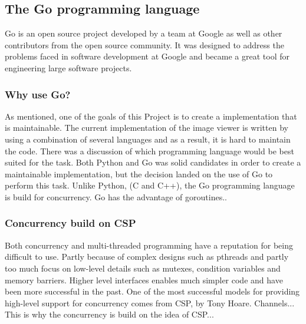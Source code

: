 \documentclass[12pt, a4paper, oneside]{article}
\begin{document}
\subsection{The Go programming language}
Go is an open source project developed by a team at Google as well as other contributors from the open source community. It was designed to address the problems faced in software development at Google and became a great tool for engineering large software projects.

\subsubsection{Why use Go?}
As mentioned, one of the goals of this Project is to create a implementation that is maintainable. The current implementation of the image viewer is written by using a combination of several languages and as a result, it is hard to maintain the code. 
There was a discussion of which programming language would be best suited for the task. Both Python and Go was solid candidates in order to create a maintainable implementation, but the decision landed on the use of Go to perform this task.
Unlike Python, (C and C++), the Go programming language is build for concurrency. 
Go has the advantage of goroutines..

\subsubsection{Concurrency build on CSP}
Both concurrency and multi-threaded programming have a reputation for being difficult to use. Partly because of complex designs such as pthreads and partly too much focus on low-level details such as mutexes, condition variables and memory barriers. Higher level interfaces enables much simpler code and have been more successful in the past. One of the most successful models for providing high-level support for concurrency comes from CSP, by Tony Hoare. 
Channels... 
This is why the concurrency is build on the idea of CSP...
\end{document}
